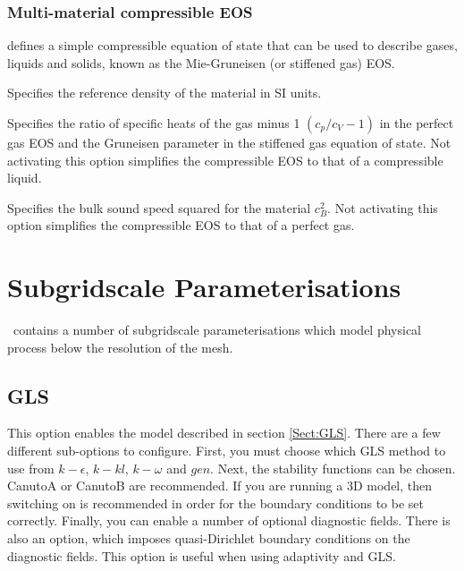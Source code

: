 \subsubsection{Multi-material compressible EOS}\label{Sect:Multi-material compressible EOS}
 defines a simple compressible equation of state that can be used to describe gases, liquids and solids, known as the Mie-Gruneisen (or stiffened gas) EOS. %

\begin{description}
\item{} Specifies the reference density of the material in SI units.
\item{} Specifies the ratio of specific heats of the gas minus 1 $(c_p/c_V-1)$ in the perfect gas EOS and the Gruneisen parameter in the stiffened gas equation of state. Not activating this option simplifies the compressible EOS to that of a compressible liquid.
\item{} Specifies the bulk sound speed squared for the material $c_B^2$. Not activating this option simplifies the compressible EOS to that of a perfect gas.
\end{description}

\section{Subgridscale Parameterisations}

\fluidity\ contains a number of subgridscale parameterisations which model physical process below the resolution of the mesh.

\subsection{GLS}

This option enables the model described in section \ref{Sect:GLS}. There are a few different 
sub-options to configure. First, you must choose which GLS method to use 
from $k-\epsilon$, $k-kl$, $k-\omega$ and $gen$. Next, the stability functions
can be chosen. CanutoA or CanutoB are recommended. If you are running a 3D model, then switching on  
 is recommended in order for the boundary conditions to be set correctly. 
Finally, you can enable a number of optional diagnostic fields.
There is also an option,  which imposes
quasi-Dirichlet boundary conditions on the diagnostic fields. This option is useful when using adaptivity
and GLS.

